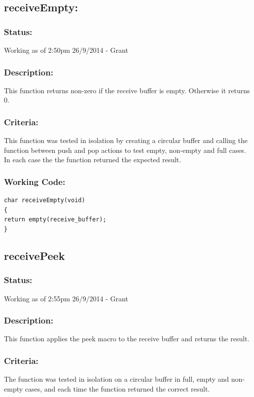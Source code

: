 \documentclass[]{report}
\begin{document}
\subsection{receiveEmpty:}
\subsubsection{Status:}
Working as of 2:50pm 26/9/2014 - Grant

\subsubsection{Description:}
This function returns non-zero if the receive buffer is empty. Otherwise it returns 0.

\subsubsection{Criteria:}
This function was tested in isolation by creating a circular buffer and calling the function between push and pop actions to test empty, non-empty and full cases. In each case the the function returned the expected result.

\subsubsection{Working Code:}
\begin{lstlisting}
char receiveEmpty(void)
{
return empty(receive_buffer);
}
\end{lstlisting}


\subsection{receivePeek}
\subsubsection{Status:}
Working as of 2:55pm 26/9/2014 - Grant

\subsubsection{Description:}
This function applies the peek macro to the receive buffer and returns the result.

\subsubsection{Criteria:}
The function was tested in isolation on a circular buffer in full, empty and non-empty cases, and each time the function returned the correct result.
\end{document}
